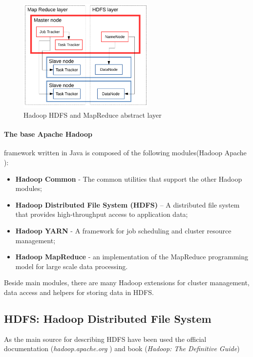 \documentclass[a4paper,12pt,oneside]{report}
\begin{document}
 \begin{figure}[h!]
    \centering
    \includegraphics[width=0.6\textwidth]{./img/schema2.pdf}
    \caption[Hadoop architecture2]{\centering Hadoop HDFS and MapReduce abstract layer  }
 \end{figure} 
\paragraph*{The base Apache Hadoop}framework written in Java is composed of the following modules(Hadoop Apache \cite{hadoop_web}):
\begin{itemize}
\item \textbf{Hadoop Common} - The common utilities that support the other Hadoop modules;
\item \textbf{Hadoop Distributed File System (HDFS)} – A distributed file system that provides
 high-throughput access to application data;
\item \textbf{Hadoop YARN} - A framework for job scheduling and cluster resource management;
\item \textbf{Hadoop MapReduce} - an implementation of the MapReduce programming model 
for large scale data processing.
\end{itemize}
Beside main modules, there are many Hadoop extensions for cluster management, 
data access and helpers for storing data in HDFS.

		\subsection{HDFS: Hadoop Distributed File System}\label{subsec:hdfs}
As the main source for describing HDFS have been used the official documentation (\textit{hadoop.apache.org} 
\cite{hadoop_web}) and book (\textit{Hadoop: The Definitive Guide}\cite{hadoop_definitive})
\end{document}
